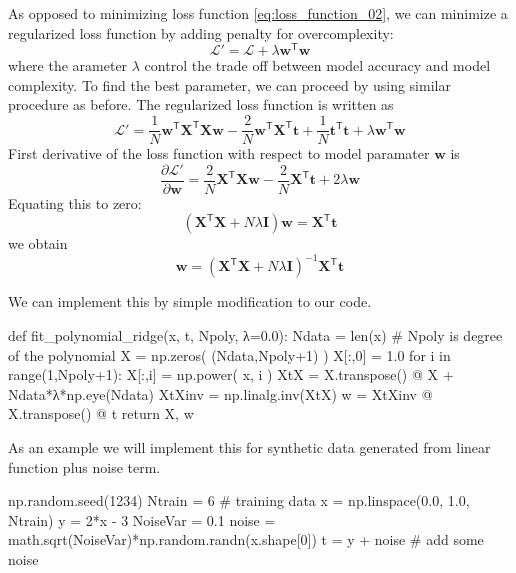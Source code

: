 As opposed to minimizing loss function \eqref{eq:loss_function_02}, we can minimize
a regularized loss function by adding penalty for overcomplexity:
\begin{equation*}
\mathcal{L}' = \mathcal{L} + \lambda \mathbf{w}^{\mathsf{T}} \mathbf{w}
\end{equation*}
where the arameter $\lambda$ control the trade off between model accuracy and
model complexity.
To find the best parameter, we can proceed by using similar procedure as before.
The regularized loss function is written as
\begin{equation}
\mathcal{L}' = \frac{1}{N} \mathbf{w}^{\mathsf{T}} \mathbf{X}^{\mathsf{T}} \mathbf{X} \mathbf{w}
- \frac{2}{N} \mathbf{w}^{\mathsf{T}} \mathbf{X}^{\mathsf{T}} \mathbf{t}
+ \frac{1}{N} \mathbf{t}^{\mathsf{T}} \mathbf{t}
+ \lambda \mathbf{w}^{\mathsf{T}} \mathbf{w}
\end{equation}
First derivative of the loss function with respect to model paramater $\mathbf{w}$ is
\begin{equation*}
\frac{\partial \mathcal{L}'}{\partial \mathbf{w}} =
\frac{2}{N} \mathbf{X}^{\mathsf{T}} \mathbf{X} \mathbf{w}
- \frac{2}{N} \mathbf{X}^{\mathsf{T}} \mathbf{t} + 2\lambda\mathbf{w}
\end{equation*}
Equating this to zero:
\begin{equation*}
( \mathbf{X}^{\mathsf{T}} \mathbf{X} + N \lambda \mathbf{I} ) \mathbf{w} = \mathbf{X}^{\mathsf{T}} \mathbf{t}
\end{equation*}
we obtain
\begin{equation}
\mathbf{w} =
( \mathbf{X}^{\mathsf{T}} \mathbf{X} + N \lambda \mathbf{I} )^{-1}
\mathbf{X}^{\mathsf{T}} \mathbf{t}
\end{equation}

We can implement this by simple modification to our code.
\begin{pythoncode}
def fit_polynomial_ridge(x, t, Npoly, λ=0.0):
    Ndata = len(x)
    # Npoly is degree of the polynomial
    X = np.zeros( (Ndata,Npoly+1) )
    X[:,0] = 1.0
    for i in range(1,Npoly+1):
        X[:,i] = np.power( x, i )
    XtX = X.transpose() @ X + Ndata*λ*np.eye(Ndata)
    XtXinv = np.linalg.inv(XtX)
    w = XtXinv @ X.transpose() @ t
    return X, w
\end{pythoncode}

As an example we will implement this for synthetic data generated from linear
function plus noise term.
\begin{juliacode}
np.random.seed(1234)
Ntrain = 6 # training data
x = np.linspace(0.0, 1.0, Ntrain)
y = 2*x - 3
NoiseVar = 0.1
noise = math.sqrt(NoiseVar)*np.random.randn(x.shape[0])
t = y + noise # add some noise
\end{juliacode}



